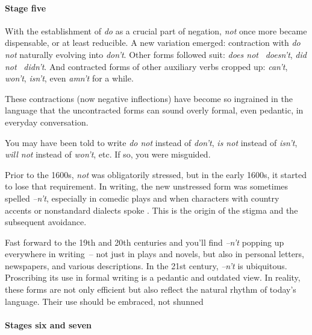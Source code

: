 \paragraph*{Stage five}

With the establishment of \textit{do} as a crucial part of negation, \textit{not} once more became dispensable, or at least reducible. A new variation emerged: contraction with \textit{do not} naturally evolving into \textit{don't}. Other forms followed suit: \textit{does not} \rightarrow ~\textit{doesn't}, \textit{did not} \rightarrow ~\textit{didn't}. And contracted forms of other auxiliary verbs cropped up: \textit{can't}, \textit{won't}, \textit{isn't}, even \textit{amn't} for a while.

These contractions (now negative inflections) have become so ingrained in the language that the uncontracted forms can sound overly formal, even pedantic, in everyday conversation.

\begin{tcolorbox}[title=\is{auxiliary verb!negative form}Negative auxiliary verbs, colback=white]

You may have been told to write \textit{do not} instead of \textit{don't}, \textit{is not} instead of \textit{isn't}, \textit{will not} instead of \textit{won't}, etc. If so, you were misguided. 

\phantom{fri}Prior to the 1600s, \textit{not} was obligatorily stressed, but in the early 1600s, it started to lose that requirement. In writing, the new unstressed form was sometimes spelled \textit{--n't}, especially in comedic plays and when characters with country accents or nonstandard dialects spoke \citep{Brainerd1989}. This is the origin of the stigma and the subsequent avoidance.

\phantom{fri}Fast forward to the 19th and 20th centuries and you'll find \textit{--n't} popping up everywhere in writing~-- not just in plays and novels, but also in personal letters, newspapers, and various descriptions. In the 21st century, \textit{--n't} is ubiquitous. Proscribing its use in formal writing is a pedantic and outdated view. In reality, these forms are not only efficient but also reflect the natural rhythm of today's language. Their use should be embraced, not shunned

\end{tcolorbox}

\paragraph*{Stages six and seven}

